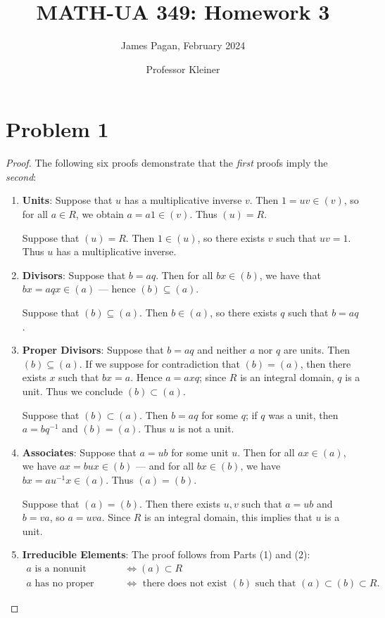 \documentclass[11pt]{article}
\title{MATH-UA 349: Homework 3}
\author{James Pagan, February 2024}
\date{Professor Kleiner}
\begin{document}
\maketitle
\tableofcontents
\newpage


\section{Problem 1}

\begin{proof}
  The following six proofs demonstrate that the \textit{first} proofs imply the \textit{second}:
  \begin{enumerate}
    \item \textbf{Units}: Suppose that $u$ has a multiplicative inverse $v$. Then $1 = uv \in (v)$, so for all $a \in R$, we obtain $a = a1 \in (v)$. Thus $(u) = R$.
  
    Suppose that $(u) = R$. Then $1 \in (u)$, so there exists $v$ such that $uv = 1$. Thus $u$ has a multiplicative inverse.
    \item \textbf{Divisors}: Suppose that $b = aq$. Then for all $bx \in (b)$, we have that $bx = aqx \in (a)$ --- hence $(b) \subseteq (a)$.

    Suppose that $(b) \subseteq (a)$. Then $b \in (a)$, so there exists $q$ such that $b = aq$.
    \item \textbf{Proper Divisors}: Suppose that $b = aq$ and neither $a$ nor $q$ are units. Then $(b) \subseteq (a)$. If we suppose for contradiction that $(b) = (a)$, then there exists $x$ such that $bx = a$. Hence $a = axq$; since $R$ is an integral domain, $q$ is a unit. Thus we conclude $(b) \subset (a)$.

    Suppose that $(b) \subset (a)$. Then $b = aq$ for some $q$; if $q$ was a unit, then $a = bq^{-1}$ and $(b) = (a)$. Thus $u$ is not a unit.
 
    \item \textbf{Associates}: Suppose that $a = ub$ for some unit $u$. Then for all $ax \in (a)$, we have $ax = bux \in (b)$ --- and for all $bx \in (b)$, we have $bx = au^{-1}x \in (a)$. Thus $(a) = (b)$.

    Suppose that $(a) = (b)$. Then there exists $u, v$ such that $a = ub$ and $b = va$, so $a = uva$. Since $R$ is an integral domain, this implies that $u$ is a unit.
    \item \textbf{Irreducible Elements}: The proof follows from Parts (1) and (2):
    \begin{align*}
      a \text{ is a nonunit } & \iff (a) \subset R \\
      a \text{ has no proper divisors } & \iff \text{ there does not exist $(b)$ such that } (a) \subset (b) \subset R.
    \end{align*}
    

\end{enumerate}
\end{proof}
\end{document}
